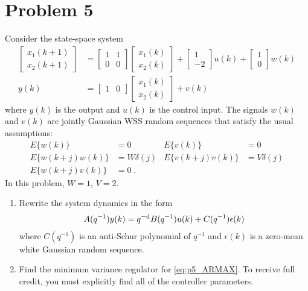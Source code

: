 \section*{Problem 5}

Consider the state-space system
\begin{align*}
    \begin{bmatrix}
            x_1(k+1) \\
            x_2(k+1)
        \end{bmatrix} & = \begin{bmatrix}
            1 & 1 \\
            0 & 0
        \end{bmatrix} \begin{bmatrix}
            x_1(k) \\
            x_2(k)
        \end{bmatrix} + \begin{bmatrix}
            1 \\
            -2
        \end{bmatrix} u(k) + \begin{bmatrix}
            1 \\
            0
        \end{bmatrix} w(k) \\
    y(k) & = \begin{bmatrix}
            1 & 0
        \end{bmatrix} \begin{bmatrix}
            x_1(k) \\
            x_2(k)
        \end{bmatrix} + v(k)
\end{align*}
where $y(k)$ is the output and $u(k)$ is the control input. The signals $w(k)$ and $v(k)$ are jointly Gaussian WSS random sequences that satisfy the usual assumptions:
\begin{align*}
    E \{ w(k) \} & = 0
        & E \{ v(k) \} & = 0 \\
    E \{ w(k+j) w(k) \} & = W \delta(j)
        & E \{ v(k+j) v(k) \} & = V \delta(j) \\
    E \{ w(k+j) v(k) \} & = 0 \; .
\end{align*}
In this problem, $W = 1$, $V = 2$.

\begin{enumerate}
    \item
    Rewrite the system dynamics in the form
    \begin{align}
        A(q^{-1}) y(k) = q^{-\textrm{d}} B(q^{-1}) u(k) + C(q^{-1}) \epsilon(k)
            \label{eq:p5_ARMAX}
    \end{align}
    where $C(q^{-1})$ is an anti-Schur polynomial of $q^{-1}$ and $\epsilon(k)$ is a zero-mean white Gaussian random sequence.

    \item
    Find the minimum variance regulator for \eqref{eq:p5_ARMAX}. To receive full credit, you must explicitly find all of the controller parameters.

\end{enumerate}



